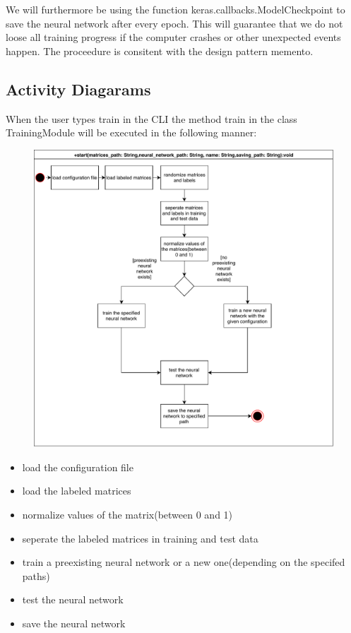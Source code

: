 \documentclass[parskip=full]{scrartcl}
\begin{document}
We will furthermore be using the function keras.callbacks.ModelCheckpoint to save the \gls{neural network} after every epoch.
This will guarantee that we do not loose all training progress if the computer crashes or other unexpected events happen.
The proceedure is consitent with the design pattern \gls{memento}.


\subsection{Activity Diagarams}
When the user types train in the CLI the method train in the class TrainingModule will be executed in the following manner:

\begin{figure}[h]
\begin{center}
\includegraphics[scale=0.9]{ActivityDiagrams/PDF/TrainingModule}
\label{Activity Diagrams}
\end{center}
\end{figure}

\begin{itemize}
\item load the configuration file
\item load the labeled matrices
\item normalize values of the matrix(between 0 and 1)
\item seperate the labeled matrices in training and test data
\item train a preexisting \gls{neural network} or a new one(depending on the specifed paths)
\item test the \gls{neural network}
\item save the \gls{neural network}
\end{itemize}
\end{document}
